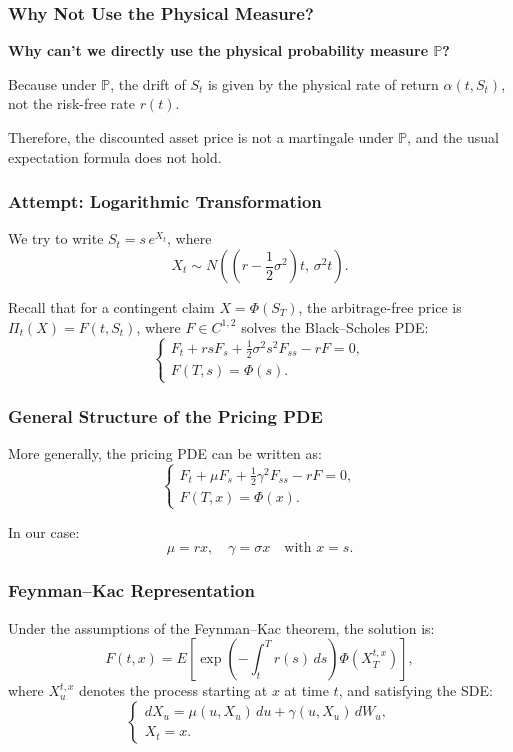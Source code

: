 \documentclass[12pt,a4paper]{article}
\theoremstyle{definition}
\newcommand{\Prob}{\mathbb{P}}
\begin{document}
\subsubsection{Why Not Use the Physical Measure?}

\textbf{Why can't we directly use the physical probability measure $\Prob$?}

Because under $\Prob$, the drift of $S_t$ is given by the physical rate of return $\alpha(t, S_t)$, not the risk-free rate $r(t)$.

Therefore, the discounted asset price is not a martingale under $\Prob$, and the usual expectation formula does not hold.

\subsubsection{Attempt: Logarithmic Transformation}

We try to write $S_t = s \, e^{X_t}$, where
\[
X_t \sim N\left(\left(r - \frac{1}{2}\sigma^2\right)t, \, \sigma^2 t\right).
\]

Recall that for a contingent claim $X = \Phi(S_T)$, the arbitrage-free price is $\Pi_t(X) = F(t, S_t)$, where $F \in C^{1,2}$ solves the Black–Scholes PDE:
\[
\begin{cases}
F_t + r s F_s + \frac{1}{2}\sigma^2 s^2 F_{ss} - r F = 0, \\
F(T, s) = \Phi(s).
\end{cases}
\]

\subsubsection{General Structure of the Pricing PDE}

More generally, the pricing PDE can be written as:
\[
\begin{cases}
F_t + \mu F_s + \frac{1}{2}\gamma^2 F_{ss} - r F = 0, \\
F(T, x) = \Phi(x).
\end{cases}
\]

In our case:
\[
\mu = r x, \quad \gamma = \sigma x \quad \text{with } x = s.
\]

\subsubsection{Feynman–Kac Representation}

Under the assumptions of the Feynman–Kac theorem, the solution is:
\[
F(t, x) = E\left[\exp\left(-\int_t^T r(s) \, ds\right)\Phi(X_T^{t,x})\right],
\]
where $X_u^{t,x}$ denotes the process starting at $x$ at time $t$, and satisfying the SDE:
\[
\begin{cases}
dX_u = \mu(u, X_u) \, du + \gamma(u, X_u) \, dW_u, \\
X_t = x.
\end{cases}
\]
\end{document}
